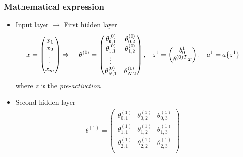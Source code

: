 \documentclass[a4paper,10pt]{article}
\begin{document}
\subsubsection{Mathematical expression}
\begin{itemize}
    \item Input layer $\rightarrow$ First hidden layer
        \begin{gather*}
            x  = 
            \begin{pmatrix}
                x_{1} \\
                x_{2} \\
                \vdots \\
                x_{m} \\
            \end{pmatrix}
            \Rightarrow\hspace*{0.4cm}\theta^{(0)} = 
            \begin{pmatrix}
                \theta_{0,1}^{(0)} & \theta_{0,2}^{(0)}  \\
                \theta_{1,1}^{(0)} & \theta_{1,2}^{(0)}  \\
                \vdots \\
                \theta_{N,1}^{(0)} & \theta_{N,2}^{(0)}  \\
              \end{pmatrix}
              ,\hspace*{0.3cm}
              z^1 = 
              \begin{pmatrix}
                b_0^1 \\
                \theta^{(0)T}x \\
              \end{pmatrix}
              ,\hspace*{0.3cm}
              a^1 = a\{z^1\} 
        \end{gather*}
    where $z$ is the \textit{pre-activation}
    \item Second hidden layer 
        \begin{gather*}
        \theta^{(1)} =
            \begin{pmatrix}
                \theta_{0,1}^{(1)} & \theta_{0,2}^{(1)} & \theta_{0,3}^{(1)}  \\
                \theta_{1,1}^{(1)} & \theta_{1,2}^{(1)} & \theta_{1,3}^{(1)} \\
                \theta_{2,1}^{(1)} & \theta_{2,2}^{(1)} & \theta_{2,3}^{(1)} \\
            \end{pmatrix}

\end{gather*}
\end{itemize}
\end{document}
